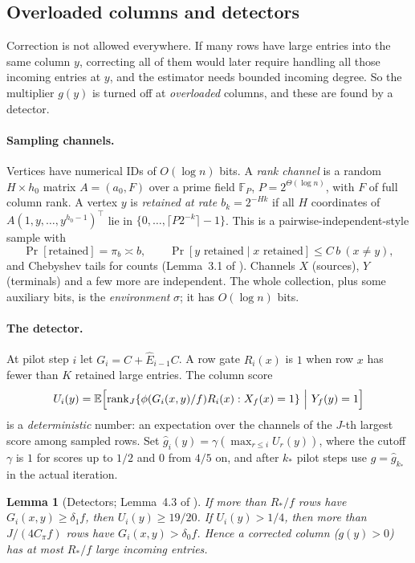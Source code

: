 \documentclass[11pt]{article}
\newtheorem{lemma}[theorem]{Lemma}
\theoremstyle{definition}
\theoremstyle{remark}
\newcommand{\F}{\mathbb F}
\newcommand{\E}{\mathbb E}
\begin{document}
\subsection{Overloaded columns and detectors}\label{sec:detectors}

Correction is not allowed everywhere. If many rows have large entries into the
same column $y$, correcting all of them would later require handling all those
incoming entries at $y$, and the estimator needs bounded incoming degree. So the
multiplier $g(y)$ is turned off at \emph{overloaded} columns, and these are found
by a detector.

\paragraph{Sampling channels.} Vertices have numerical IDs of $O(\log n)$ bits. A
\emph{rank channel} is a random $H\times h_0$ matrix $A=(a_0,F)$ over a prime field
$\F_P$, $P=2^{\Theta(\log n)}$, with $F$ of full column rank. A vertex $y$ is
\emph{retained at rate $b_k=2^{-Hk}$} if all $H$ coordinates of
$A(1,y,\dots,y^{h_0-1})^\top$ lie in $\{0,\dots,\lceil P2^{-k}\rceil-1\}$. This is a
pairwise-independent-style sample with
\[
\Pr[\text{retained}]=\pi_{b}\asymp b,\qquad
\Pr[y\text{ retained}\mid x\text{ retained}]\le C\,b\ (x\ne y),
\]
and Chebyshev tails for counts (Lemma~3.1 of \cite{OpenAI-BPL}). Channels $X$
(sources), $Y$ (terminals) and a few more are independent. The whole collection,
plus some auxiliary bits, is the \emph{environment} $\sigma$; it has $O(\log n)$
bits.

\paragraph{The detector.} At pilot step $i$ let $G_i=C+\widehat E_{i-1}C$. A row
gate $R_i(x)$ is $1$ when row $x$ has fewer than $K$ retained large entries. The
column score
\[
U_i(y)=\E\Bigl[\operatorname{rank}_J\{\phi(G_i(x,y)/f)R_i(x):X_f(x)=1\}\ \Big|\ Y_f(y)=1\Bigr]
\]
is a \emph{deterministic} number: an expectation over the channels of the $J$-th
largest score among sampled rows. Set
$\widehat g_i(y)=\gamma(\max_{r\le i}U_r(y))$, where the cutoff $\gamma$ is $1$ for
scores up to $1/2$ and $0$ from $4/5$ on, and after $k_*$ pilot steps use $g=\widehat g_{k_*}$ in the
actual iteration.

\begin{lemma}[Detectors; Lemma~4.3 of \cite{OpenAI-BPL}]\label{lem:detector}
If more than $R_*/f$ rows have $G_i(x,y)\ge\delta_1f$, then $U_i(y)\ge19/20$.
If $U_i(y)>1/4$, then more than $J/(4C_\pi f)$ rows have $G_i(x,y)>\delta_0f$.
Hence a corrected column ($g(y)>0$) has at most $R_*/f$ large incoming entries.
\end{lemma}
\end{document}
